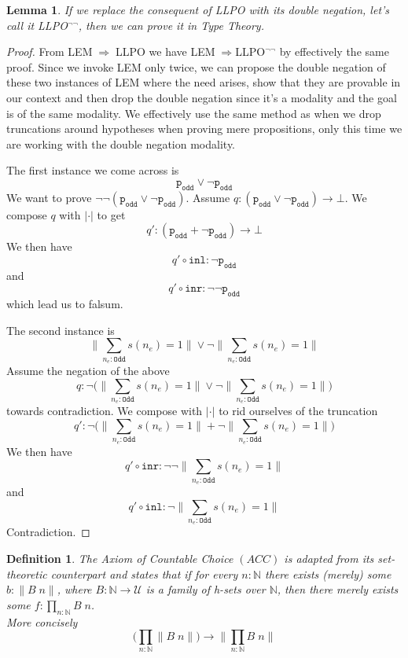 \documentclass[12pt]{report}
\newtheorem{lem}[thm]{Lemma}
\newtheorem{defn}[thm]{Definition}
\theoremstyle{definition}
\begin{document}
\begin{lem}\label{llponeg}
If we replace the consequent of LLPO with its double negation, let's call it LLPO$^{\neg\neg}$, then we can prove it in Type Theory. 
\end{lem}
\begin{proof}
From LEM$\;\Rightarrow\;$LLPO we have LEM$\;\Rightarrow$LLPO$^{\neg\neg}$ by effectively the same proof. 
Since we invoke LEM only twice, we can propose the double negation of these two instances of LEM where the need arises, show that they are provable in our context and then drop the double negation since it's a modality and the goal is of the same modality. 
We effectively use the same method as when we drop truncations around hypotheses when proving mere propositions, only this time we are working with the double negation modality. 

The first instance we come across is $$\mathtt{p_{odd}} \vee \neg \mathtt{p_{odd}}$$
We want to prove $\neg \neg (\mathtt{p_{odd}} \vee \neg \mathtt{p_{odd}})$. 
Assume $q: (\mathtt{p_{odd}} \vee \neg \mathtt{p_{odd}}) \rightarrow \bot$. 
We compose $q$ with $|\cdot|$ to get 
$$q': (\mathtt{p_{odd}} + \neg \mathtt{p_{odd}}) \rightarrow \bot$$
We then have 
$$q' \circ \mathtt{inl} : \neg\mathtt{p_{odd}}$$
and
$$q' \circ \mathtt{inr} : \neg\neg \mathtt{p_{odd}}$$
which lead us to falsum.

The second instance is 
$$\Big\lVert\sum_{n_e : \mathtt{Odd}}s(n_e)=1 \Big\rVert \vee \neg \Big\lVert\sum_{n_e : \mathtt{Odd}}s(n_e)=1 \Big\rVert$$
Assume the negation of the above 
$$q : \neg \bigg(\Big\lVert\sum_{n_e : \mathtt{Odd}}s(n_e)=1 \Big\rVert \vee \neg \Big\lVert\sum_{n_e : \mathtt{Odd}}s(n_e)=1 \Big\rVert\bigg)$$
towards contradiction. 
We compose with $|\cdot|$ to rid ourselves of the truncation
$$q' : \neg \bigg(\Big\lVert\sum_{n_e : \mathtt{Odd}}s(n_e)=1 \Big\rVert + \neg \Big\lVert\sum_{n_e : \mathtt{Odd}}s(n_e)=1 \Big\rVert\bigg)$$
We then have
$$q' \circ \mathtt{inr} : \neg \neg \Big\lVert\sum_{n_e : \mathtt{Odd}}s(n_e)=1 \Big\rVert$$
and
$$q' \circ \mathtt{inl} : \neg \Big\lVert\sum_{n_e : \mathtt{Odd}}s(n_e)=1 \Big\rVert$$
Contradiction.
\end{proof}

\begin{defn}
The Axiom of Countable Choice $(ACC)$ is adapted from its set-theoretic counterpart and states that if for every $n : \mathbb{N}$ there exists (merely) some $b : \lVert B\; n \rVert$, where $B : \mathbb{N} \rightarrow \mathcal{U}$ is a family of h-sets over $\mathbb{N}$, then there merely exists some $f : \prod_{n : \mathbb{N}} B\; n$.\\
More concisely
$$\Big(\prod_{n : \mathbb{N}} \big\lVert B\; n \big\rVert\Big) \rightarrow \Big\lVert \prod_{n : \mathbb{N}} B\; n \Big\rVert$$
\end{defn}
\end{document}
